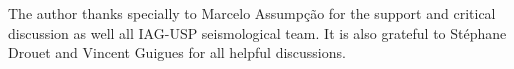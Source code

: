 \documentclass[draft, grl]{agutex}
\begin{document}
\begin{article}
\begin{acknowledgments}
The author thanks specially to Marcelo Assumpção for the support and critical discussion as well all IAG-USP seismological team. It is also grateful to Stéphane Drouet and Vincent Guigues for all helpful discussions.
\end{acknowledgments}
















\end{article}
\end{document}
